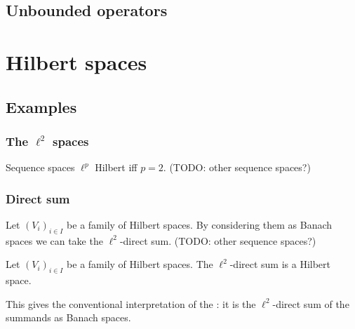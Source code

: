 \section{Unbounded operators}




\chapter{Hilbert spaces}

\section{Examples}
\subsection{The $\ell^2$ spaces}
Sequence spaces $\ell^p$ Hilbert iff $p=2$. (TODO: other sequence spaces?)

\subsection{Direct sum}
Let $(V_i)_{i\in I}$ be a family of Hilbert spaces. By considering them as Banach spaces we can take the $\ell^2$-direct sum. (TODO: other sequence spaces?)
\begin{proposition}
Let $(V_i)_{i\in I}$ be a family of Hilbert spaces. The $\ell^2$-direct sum is a Hilbert space.
\end{proposition}
This gives the conventional interpretation of the : it is the $\ell^2$-direct sum of the summands as Banach spaces.


